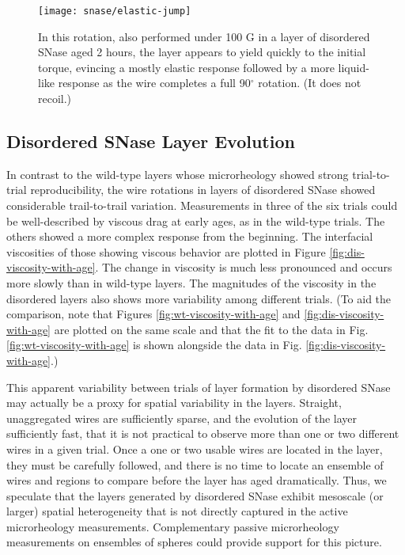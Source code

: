 \begin{figure}
    \centering
    \texttt{[image: snase/elastic-jump]} %
    \caption[Another wire rotation in a disordered SNase layer that cannot be well described by a viscous response.]{\label{fig:deviation-elastic-jump}In this rotation, also performed under 100 G in a layer of disordered SNase aged 2 hours, the layer appears to yield quickly to the initial torque, evincing a mostly elastic response followed by a more liquid-like response as the wire completes a full 90$^\circ$ rotation. (It does not recoil.)}
    \end{figure}
   

\subsection{Disordered SNase Layer Evolution}

In contrast to the wild-type layers whose microrheology showed strong trial-to-trial reproducibility, the wire rotations in layers of disordered SNase showed considerable trail-to-trail variation. Measurements in three of the six trials could be well-described by viscous drag at early ages, as in the wild-type trials. The others showed a more complex response from the beginning. The interfacial viscosities of those showing viscous behavior are plotted in Figure \ref{fig:dis-viscosity-with-age}. The change in viscosity is much less pronounced and occurs more slowly than in wild-type layers. The magnitudes of the viscosity in the disordered layers also shows more variability among different trials. (To aid the comparison, note that Figures \ref{fig:wt-viscosity-with-age} and \ref{fig:dis-viscosity-with-age} are plotted on the same scale and that the fit to the data in Fig. \ref{fig:wt-viscosity-with-age} is shown alongside the data in Fig. \ref{fig:dis-viscosity-with-age}.)

This apparent variability between trials of layer formation by disordered SNase may actually be a proxy for spatial variability in the layers. Straight, unaggregated wires are sufficiently sparse, and the evolution of the layer sufficiently fast, that it is not practical to observe more than one or two different wires in a given trial. Once a one or two usable wires are located in the layer, they must be carefully followed, and there is no time to locate an ensemble of wires and regions to compare before the layer has aged dramatically. Thus, we speculate that the layers generated by disordered SNase exhibit mesoscale (or larger) spatial heterogeneity that is not directly captured in the active microrheology measurements. Complementary passive microrheology measurements on ensembles of spheres could provide support for this picture.

